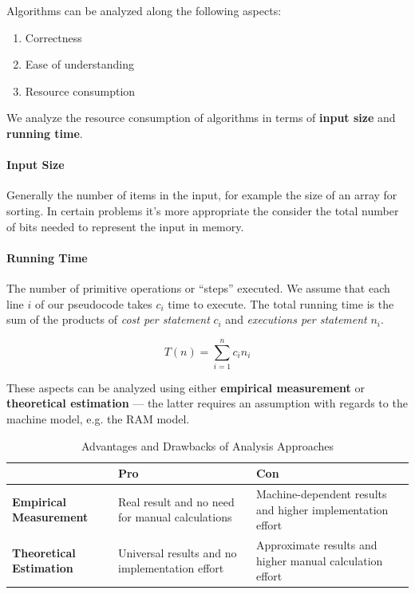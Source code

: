 Algorithms can be analyzed along the following aspects:

\begin{enumerate}
    \item Correctness
    \item Ease of understanding
    \item Resource consumption
\end{enumerate}

We analyze the resource consumption of algorithms in terms of \textbf{input size} and \textbf{running time}.

\paragraph{Input Size} Generally the number of items in the input, for example the size of an array for sorting. In certain problems it's more appropriate the consider the total number of bits needed to represent the input in memory.

\paragraph{Running Time} The number of primitive operations or ``steps'' executed. We assume that each line $i$ of our pseudocode takes $c_i$ time to execute. The total running time is the sum of the products of \emph{cost per statement} $c_i$ and \emph{executions per statement} $n_i$.

\[    T(n) =  \sum_{i = 1}^{n} c_i n_i  \]

These aspects can be analyzed using either \textbf{empirical measurement} or \textbf{theoretical estimation} --- the latter requires an assumption with regards to the machine model, e.g. the RAM model.

\begin{table}[H]
    \centering
    \begin{tabularx}{\textwidth}{XXX}
        \toprule
                                        & \textbf{Pro}                                    & \textbf{Con}                                               \\ \midrule
        \textbf{Empirical Measurement}  & Real result and no need for manual calculations & Machine-dependent results and higher implementation effort \\
        \textbf{Theoretical Estimation} & Universal results and no implementation effort  & Approximate results and higher manual calculation effort
    \end{tabularx}
    \caption{Advantages and Drawbacks of Analysis Approaches}
\end{table}


